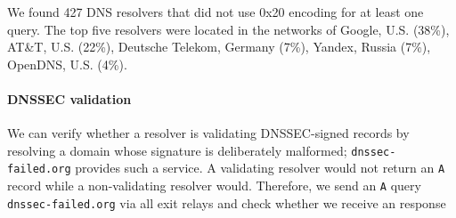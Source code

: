 We found 427 DNS resolvers that did not use 0x20 encoding for at least one
query.  The top five resolvers were located in the networks of Google, U.S.
(38\%), AT\&T, U.S. (22\%), Deutsche Telekom, Germany (7\%), Yandex, Russia
(7\%), OpenDNS, U.S. (4\%).

\paragraph{DNSSEC validation}
We can verify whether a resolver is validating DNSSEC-signed records by resolving a
domain whose signature is deliberately malformed; 
{\tt dnssec-failed.org} provides such a service.  A validating resolver
would not return an {\tt A} record while
a non-validating resolver would.  Therefore, we send an {\tt A} query {\tt dnssec-failed.org} via
all exit relays and check whether we receive an response
\fi
